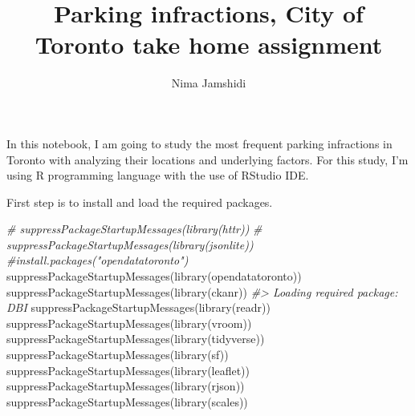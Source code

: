 \documentclass[
]{article}
\title{Parking infractions, City of Toronto take home assignment}
\author{Nima Jamshidi}
\date{}
\newenvironment{Shaded}{\begin{snugshade}}{\end{snugshade}}
\newcommand{\CommentTok}[1]{\textcolor[rgb]{0.56,0.35,0.01}{\textit{#1}}}
\newcommand{\FunctionTok}[1]{\textcolor[rgb]{0.00,0.00,0.00}{#1}}
\newcommand{\NormalTok}[1]{#1}
\begin{document}
\maketitle

{
\setcounter{tocdepth}{2}
\tableofcontents
}
In this notebook, I am going to study the most frequent parking
infractions in Toronto with analyzing their locations and underlying
factors. For this study, I'm using R programming language with the use
of RStudio IDE.

First step is to install and load the required packages.

\begin{Shaded}
\begin{Highlighting}[]
\CommentTok{\# suppressPackageStartupMessages(library(httr))}
\CommentTok{\# suppressPackageStartupMessages(library(jsonlite))}
\CommentTok{\#install.packages("opendatatoronto")}
\FunctionTok{suppressPackageStartupMessages}\NormalTok{(}\FunctionTok{library}\NormalTok{(opendatatoronto))}
\FunctionTok{suppressPackageStartupMessages}\NormalTok{(}\FunctionTok{library}\NormalTok{(ckanr))}
\CommentTok{\#\textgreater{} Loading required package: DBI}
\FunctionTok{suppressPackageStartupMessages}\NormalTok{(}\FunctionTok{library}\NormalTok{(readr))}
\FunctionTok{suppressPackageStartupMessages}\NormalTok{(}\FunctionTok{library}\NormalTok{(vroom))}
\FunctionTok{suppressPackageStartupMessages}\NormalTok{(}\FunctionTok{library}\NormalTok{(tidyverse))}
\FunctionTok{suppressPackageStartupMessages}\NormalTok{(}\FunctionTok{library}\NormalTok{(sf))}
\FunctionTok{suppressPackageStartupMessages}\NormalTok{(}\FunctionTok{library}\NormalTok{(leaflet))}
\FunctionTok{suppressPackageStartupMessages}\NormalTok{(}\FunctionTok{library}\NormalTok{(rjson))}
\FunctionTok{suppressPackageStartupMessages}\NormalTok{(}\FunctionTok{library}\NormalTok{(scales))}
\end{Highlighting}
\end{Shaded}
\end{document}
